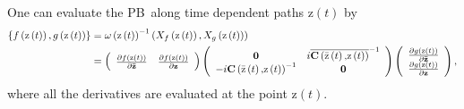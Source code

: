 \documentclass[aps,preprint]{revtex4}%
\begin{document}
One can evaluate the PB\ along time dependent paths $\mathrm{z}\left(
t\right)  $ by
\begin{align}
\left\{  f\left(  \mathrm{z}\left(  t\right)  \right)  ,g\left(
\mathrm{z}\left(  t\right)  \right)  \right\}   &  =\omega\left(
\mathrm{z}\left(  t\right)  \right)  ^{-1}\left(  X_{f}\left(  \mathrm{z}%
\left(  t\right)  \right)  ,X_{g}\left(  \mathrm{z}\left(  t\right)  \right)
\right) \nonumber\\
&  =\left(
\begin{array}
[c]{cc}%
\frac{\partial f\left(  \mathrm{z}\left(  t\right)  \right)  }{\partial
\mathbf{\bar{z}}} & \frac{\partial f\left(  \mathrm{z}\left(  t\right)
\right)  }{\partial\mathbf{z}}%
\end{array}
\right)  \left(
\begin{array}
[c]{cc}%
\mathbf{0} & i\overline{\mathbf{C}\left(  \mathrm{\bar{z}}\left(  t\right)
\mathbf{,}\mathrm{z}\left(  t\right)  \right)  }^{-1}\\
-i\mathbf{C}\left(  \mathrm{\bar{z}}\left(  t\right)  \mathbf{,}%
\mathrm{z}\left(  t\right)  \right)  ^{-1} & \mathbf{0}%
\end{array}
\right)  \left(
\begin{array}
[c]{c}%
\frac{\partial g\left(  \mathrm{z}\left(  t\right)  \right)  }{\partial
\mathbf{\bar{z}}}\\
\frac{\partial g\left(  \mathrm{z}\left(  t\right)  \right)  }{\partial
\mathbf{z}}%
\end{array}
\right)  ,
\end{align}
where all the derivatives are evaluated at the point $\mathrm{z}\left(
t\right)  .$
\end{document}
